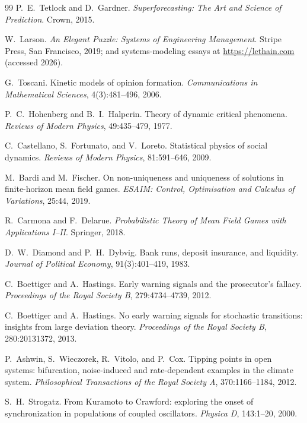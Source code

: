 \documentclass[11pt]{article}
\begin{document}
\begin{thebibliography}{99}
 P.~E.~Tetlock and D.~Gardner. \emph{Superforecasting: The Art and Science of Prediction}. Crown, 2015.

 W.~Larson. \emph{An Elegant Puzzle: Systems of Engineering Management}. Stripe Press, San Francisco, 2019; and systems-modeling essays at \url{https://lethain.com} (accessed 2026).

 G.~Toscani. Kinetic models of opinion formation. \emph{Communications in Mathematical Sciences}, 4(3):481--496, 2006.

 P.~C.~Hohenberg and B.~I.~Halperin. Theory of dynamic critical phenomena. \emph{Reviews of Modern Physics}, 49:435--479, 1977.

 C.~Castellano, S.~Fortunato, and V.~Loreto. Statistical physics of social dynamics. \emph{Reviews of Modern Physics}, 81:591--646, 2009.

 M.~Bardi and M.~Fischer. On non-uniqueness and uniqueness of solutions in finite-horizon mean field games. \emph{ESAIM: Control, Optimisation and Calculus of Variations}, 25:44, 2019.

 R.~Carmona and F.~Delarue. \emph{Probabilistic Theory of Mean Field Games with Applications I--II}. Springer, 2018.

 D.~W.~Diamond and P.~H.~Dybvig. Bank runs, deposit insurance, and liquidity. \emph{Journal of Political Economy}, 91(3):401--419, 1983.

 C.~Boettiger and A.~Hastings. Early warning signals and the prosecutor's fallacy. \emph{Proceedings of the Royal Society B}, 279:4734--4739, 2012.

 C.~Boettiger and A.~Hastings. No early warning signals for stochastic transitions: insights from large deviation theory. \emph{Proceedings of the Royal Society B}, 280:20131372, 2013.

 P.~Ashwin, S.~Wieczorek, R.~Vitolo, and P.~Cox. Tipping points in open systems: bifurcation, noise-induced and rate-dependent examples in the climate system. \emph{Philosophical Transactions of the Royal Society A}, 370:1166--1184, 2012.

 S.~H.~Strogatz. From Kuramoto to Crawford: exploring the onset of synchronization in populations of coupled oscillators. \emph{Physica D}, 143:1--20, 2000.


\end{thebibliography}
\end{document}
